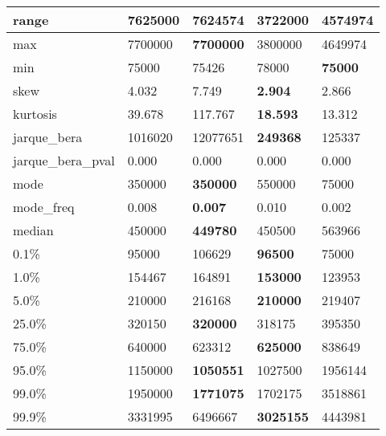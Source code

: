 \begin{table}[H]
\begin{tabular}{|l|m{10em}|m{10em}|m{10em}|m{10em}|}
\hline range & 7625000 & \bfseries 7624574 & \cellcolor[rgb]{0.9, 0.54, 0.52} 3722000 & 4574974 \\
\hline max & 7700000 & \bfseries 7700000 & \cellcolor[rgb]{0.9, 0.54, 0.52} 3800000 & 4649974 \\
\hline min & 75000 & 75426 & \cellcolor[rgb]{0.9, 0.54, 0.52} 78000 & \bfseries 75000 \\
\hline skew & 4.032 & \cellcolor[rgb]{0.9, 0.54, 0.52} 7.749 & \bfseries 2.904 & 2.866 \\
\hline kurtosis & 39.678 & \cellcolor[rgb]{0.9, 0.54, 0.52} 117.767 & \bfseries 18.593 & 13.312 \\
\hline jarque\_bera & 1016020 & \cellcolor[rgb]{0.9, 0.54, 0.52} 12077651 & \bfseries 249368 & 125337 \\
\hline jarque\_bera\_pval & 0.000 & 0.000 & 0.000 & 0.000 \\
\hline mode & 350000 & \bfseries 350000 & 550000 & \cellcolor[rgb]{0.9, 0.54, 0.52} 75000 \\
\hline mode\_freq & 0.008 & \bfseries 0.007 & 0.010 & \cellcolor[rgb]{0.9, 0.54, 0.52} 0.002 \\
\hline median & 450000 & \bfseries 449780 & 450500 & \cellcolor[rgb]{0.9, 0.54, 0.52} 563966 \\
\hline 0.1\% & 95000 & 106629 & \bfseries 96500 & \cellcolor[rgb]{0.9, 0.54, 0.52} 75000 \\
\hline 1.0\% & 154467 & 164891 & \bfseries 153000 & \cellcolor[rgb]{0.9, 0.54, 0.52} 123953 \\
\hline 5.0\% & 210000 & 216168 & \bfseries 210000 & \cellcolor[rgb]{0.9, 0.54, 0.52} 219407 \\
\hline 25.0\% & 320150 & \bfseries 320000 & 318175 & \cellcolor[rgb]{0.9, 0.54, 0.52} 395350 \\
\hline 75.0\% & 640000 & 623312 & \bfseries 625000 & \cellcolor[rgb]{0.9, 0.54, 0.52} 838649 \\
\hline 95.0\% & 1150000 & \bfseries 1050551 & 1027500 & \cellcolor[rgb]{0.9, 0.54, 0.52} 1956144 \\
\hline 99.0\% & 1950000 & \bfseries 1771075 & 1702175 & \cellcolor[rgb]{0.9, 0.54, 0.52} 3518861 \\
\hline 99.9\% & 3331995 & \cellcolor[rgb]{0.9, 0.54, 0.52} 6496667 & \bfseries 3025155 & 4443981 \\
\hline
\end{tabular}
\end{table}
